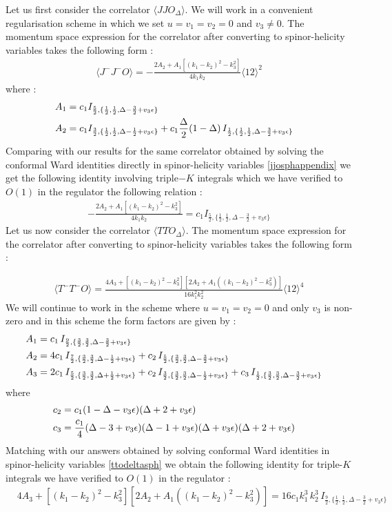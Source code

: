 \documentclass[a4paper,11pt]{article}
\begin{document}
Let us first consider the correlator $\langle JJO_\Delta\rangle$. We will work in a convenient regularisation scheme in which we set $u=v_1=v_2=0$ and $v_3\ne 0$. The momentum space expression for the correlator after converting to spinor-helicity variables takes the following form :
%
\begin{align}
\langle J^-J^-O\rangle=-\frac{2A_2+A_1\left[(k_1-k_2)^2-k_3^2\right]}{4k_1k_2}\langle 12\rangle^2
\end{align}
%
where \cite{Bzowski:2018fql} :
\begin{align}
A_1&=c_1I_{\frac 52,\{\frac 12,\frac 12,\Delta-\frac 32+v_3\epsilon\}}\cr
A_2&=c_1I_{\frac 32,\{\frac 12,\frac 12,\Delta-\frac 12+v_3\epsilon\}}+c_1\frac {\Delta}{2}(1-\Delta)\,I_{\frac 12,\{\frac 12,\frac 12,\Delta-\frac 32+v_3\epsilon\}}
\end{align}
Comparing with our results for the same correlator obtained by solving the conformal Ward identities directly in spinor-helicity variables \eqref{jjosphappendix} we get the following identity involving triple$-K$ integrals which we have verified to $O(1)$ in the regulator the following relation :
%
\begin{align}
-\frac{2A_2+A_1\left[(k_1-k_2)^2-k_3^2\right]}{4k_1k_2}=c_1I_{\frac 52,\{\frac 12,\frac 12,\Delta-\frac 32+v_3\epsilon\}}
\end{align}
%
Let us now consider the correlator $\langle TTO_\Delta\rangle$. The momentum space expression for the correlator after converting to spinor-helicity variables takes the following form :

\begin{align}
\langle T^-T^-O\rangle=\frac{4A_3+\left[(k_1-k_2)^2-k_3^2\right]\left[2A_2+A_1((k_1-k_2)^2-k_3^2)\right]}{16k_1^2k_2^2}\langle 12\rangle^4
\end{align}
We will continue to work in the scheme where $u=v_1=v_2=0$ and only $v_3$ is non-zero and in this scheme the form factors are given by \cite{Bzowski:2018fql} :
\begin{align}
A_1&=c_1\,I_{\frac 92,\{\frac 32,\frac 32,\Delta-\frac 32+v_3\epsilon\}}\cr
A_2&=4c_1\,I_{\frac 72,\{\frac 32,\frac 32,\Delta-\frac 12+v_3\epsilon\}}+c_2\,I_{\frac 52,\{\frac 32,\frac 32,\Delta-\frac 32+v_3\epsilon\}}\cr
A_3&=2c_1\,I_{\frac 52,\{\frac 32,\frac 32,\Delta+\frac 12+v_3\epsilon\}}+c_2\,I_{\frac 32,\{\frac 32,\frac 32,\Delta-\frac 12+v_3\epsilon\}}+c_3\,I_{\frac 12,\{\frac 32,\frac 32,\Delta-\frac 32+v_3\epsilon\}}
\end{align}
%
where
%
\begin{align}
c_2&=c_1(1-\Delta-v_3\epsilon)(\Delta+2+v_3\epsilon)\cr
c_3&=\frac{c_1}{4}(\Delta-3+v_3\epsilon)(\Delta-1+v_3\epsilon)(\Delta+v_3\epsilon)(\Delta+2+v_3\epsilon)
\end{align}
%
Matching with our answers obtained by solving conformal Ward identities in spinor-helicity variables \eqref{ttodeltasph} we obtain the following identity for triple-$K$ integrals we have verified to $O(1)$ in the regulator :
\begin{align}
&{4A_3+\left[(k_1-k_2)^2-k_3^2\right]\left[2A_2+A_1((k_1-k_2)^2-k_3^2)\right]}=16c_1k_1^3\,k_2^3\,I_{\frac 92,\{\frac 12,\frac 12,\Delta-\frac 32+v_3\epsilon\}}
\end{align}
\end{document}
